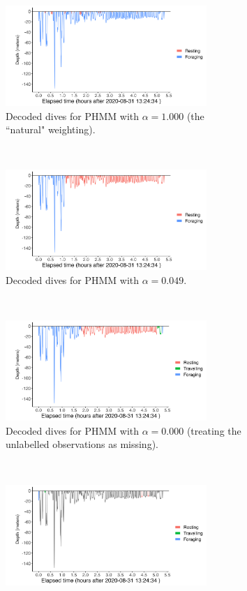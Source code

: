 \begin{figure}
    \centering
    \begin{subfigure}[t]{0.45\textwidth}
        \centering
        \includegraphics[width = 3in]{plt/D26b-profile-D26b-fixed-1.png}
        \caption{Decoded dives for PHMM with $\alpha = 1.000$ (the ``natural" weighting).}
    \end{subfigure}%
    ~ 
    \begin{subfigure}[t]{0.45\textwidth}
        \centering
        \includegraphics[width = 3in]{plt/D26b-profile-D26b-fixed-0.049.png}
        \caption{Decoded dives for PHMM with $\alpha = 0.049$.}
    \end{subfigure}
    \\
    \begin{subfigure}[t]{0.45\textwidth}
        \centering
        \includegraphics[width = 3in]{plt/D26b-profile-D26b-fixed-0.png}
        \caption{Decoded dives for PHMM with $\alpha = 0.000$ (treating the unlabelled observations as missing).}
    \end{subfigure}
    ~
    \begin{subfigure}[t]{0.45\textwidth}
        \centering
        \includegraphics[width = 3in]{plt/D26b-profile-D26b-known_states.png}

\end{subfigure}
\end{figure}
